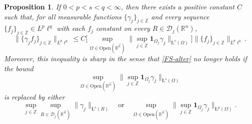 \documentclass[11pt, reqno]{amsart}
\newtheorem{proposition}[theorem]{Proposition}
\theoremstyle{definition}
\theoremstyle{remark}
\numberwithin{equation}{section}
\newcommand{\D}{\mathscr D}
\newcommand{\R}{\mathbb R}
\newcommand{\Z}{\mathbb Z}
\newcommand{\vn}{\vec n}
\newcommand{\one}{\mathbf{1}}
\newcommand{\aveL}{\textit{\L}}
\newcommand{\Norm}[2]{\|#1\|_{#2}}
\newcommand{\bNorm}[2]{\big\|#1\big\|_{#2}}
\newcommand{\Open}{\mathrm{Open}}
\begin{document}
\begin{proposition}\label{carl last 2}
If $0<p<s<q<\infty$,
then there exists a positive constant $C$ such that,
for all measurable functions $\{\gamma_j\}_{j\in\mathbb Z}$ and
every sequence $\{f_j\}_{j\in\mathbb Z}\in L^p\ell^q$
with each $f_j$ constant on every $R\in\D_j(\mathbb R^n)$,
\begin{equation}\label{FS-alter}
\bNorm{\{\gamma_jf_j\}_{j\in\mathbb Z}}{L^p\ell^q}
\le C\bigg[\sup_{\Omega\in\Open(\R^{\vn})}\Big\|\sup_{j\in\mathbb Z}\one_{\Omega_j}\gamma_j\Big\|_{\aveL^s(\Omega)}\bigg]
\bNorm{\{ f_j\}_{j\in\mathbb Z}}{L^p\ell^q}.
\end{equation}
Moreover, this inequality is sharp in the sense that
\eqref{FS-alter} no longer holds if
the bound
$$\sup_{\Omega\in\Open(\R^{\vn})}\Big\|\sup_{j\in\mathbb Z}
\one_{\Omega_j}\gamma_j\Big\|_{\aveL^s(\Omega)}$$
is replaced by either
$$
\sup_{j\in\Z}\sup_{R\in\D_j(\R^{\vn})}
\Norm{\gamma_j}{\aveL^s(R)}
\quad\text{or}\quad
\sup_{\Omega\in\Open(\R^{\vn})}\Big\|\sup_{j\in\mathbb Z}\one_{\Omega_j}\gamma_j\Big\|_{\aveL^p(\Omega)}.
$$
\end{proposition}
\end{document}
